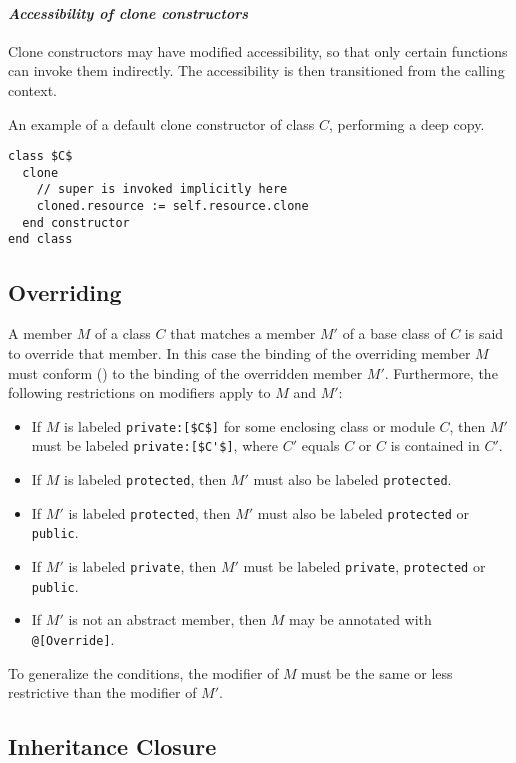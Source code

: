\paragraph{\em Accessibility of clone constructors}
Clone constructors may have modified accessibility, so that only certain functions can invoke them indirectly. The accessibility is then transitioned from the calling context. 

\example An example of a default clone constructor of class $C$, performing a deep copy. 
\begin{lstlisting}
class $C$
  clone
    // super is invoked implicitly here
    cloned.resource := self.resource.clone
  end constructor
end class
\end{lstlisting}

\subsection{Overriding}
\label{sec:overriding}

A member $M$ of a class $C$ that matches a member $M'$ of a base class of $C$ is said to override that member. In this case the binding of the overriding member $M$ must conform () to the binding of the overridden member $M'$. Furthermore, the following restrictions on modifiers apply to $M$ and $M'$: 
\begin{itemize}
\item If $M$ is labeled \lstinline!private:[$C$]! for some enclosing class or module $C$, then $M'$ must be labeled \lstinline!private:[$C'$]!, where $C'$ equals $C$ or $C$ is contained in $C'$. %
\item If $M$ is labeled \lstinline!protected!, then $M'$ must also be labeled \lstinline!protected!. 
\item If $M'$ is labeled \lstinline!protected!, then $M'$ must also be labeled \lstinline!protected! or \lstinline!public!. 
\item If $M'$ is labeled \lstinline!private!, then $M'$ must be labeled \lstinline!private!, \lstinline!protected! or \lstinline!public!. 
\item If $M'$ is not an abstract member, then $M$ may be annotated with \lstinline!@[Override]!. 
\end{itemize}

To generalize the conditions, the modifier of $M$ must be the same or less restrictive than the modifier of $M'$. 

\subsection{Inheritance Closure}
\label{sec:inheritance-closure}


